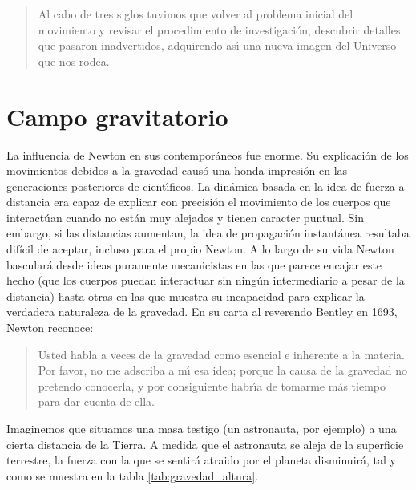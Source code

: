 \begin{quote}
Al cabo de tres siglos tuvimos que volver al problema inicial del movimiento y revisar el procedimiento de investigaci\'on, descubrir detalles que pasaron inadvertidos, adquirendo as\'\i{} una nueva imagen del Universo que nos rodea\cite{Einstein1938}.
\end{quote}






\section{Campo gravitatorio}
La influencia de Newton en sus contempor\'aneos fue enorme. Su explicaci\'on de los movimientos debidos a la gravedad caus\'o una honda impresi\'on en las generaciones posteriores de cient\'\i{}ficos. La din\'amica basada en la idea de fuerza a distancia era capaz de explicar con precisi\'on el movimiento de los cuerpos que interact\'uan cuando no est\'an muy alejados y tienen caracter puntual.
Sin embargo, si las distancias aumentan, la idea de propagaci\'on instant\'anea resultaba dif\'icil de aceptar, incluso para el propio Newton. A lo largo de su vida Newton bascular\'a desde ideas puramente mecanicistas en las que parece encajar este hecho (que los cuerpos puedan interactuar sin ning\'un intermediario a pesar de la distancia) hasta otras en las que muestra su incapacidad para explicar la verdadera naturaleza de la gravedad. En su carta al reverendo Bentley en 1693, Newton reconoce\cite{NewtonBentleyLetter1693}:
\begin{quote}
Usted habla a veces de la gravedad como esencial e inherente a la materia. Por favor, no me adscriba a m\'\i{} esa idea; porque la causa de la gravedad no pretendo conocerla, y por consiguiente habr\'\i{}a de tomarme más tiempo para dar cuenta de ella.
\end{quote}

Imaginemos que situamos una masa testigo (un astronauta, por ejemplo) a una cierta distancia de la Tierra. A medida que el astronauta se aleja de la superficie terrestre, la fuerza con la que se sentir\'a atraido por el planeta disminuir\'a, tal y como se muestra en la tabla \ref{tab:gravedad_altura}. 

